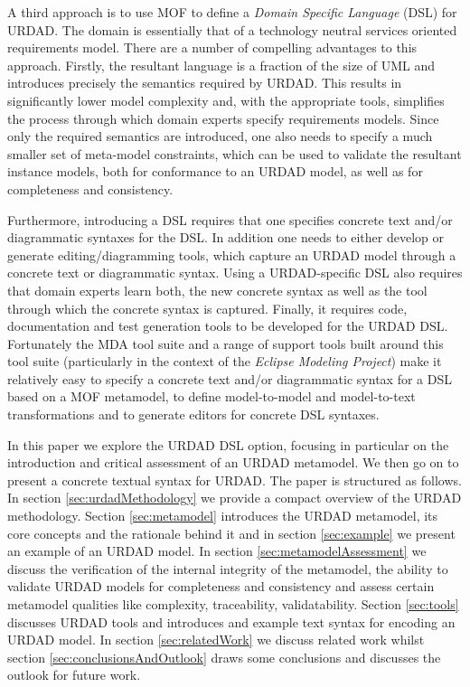 A third approach is to use MOF to define a {\em Domain Specific Language} (DSL) for URDAD. The domain is essentially that of a technology neutral services oriented requirements model. There are a number of compelling advantages to this approach. Firstly, the resultant language is a fraction of the size of UML and introduces precisely the semantics required by URDAD. This results in significantly lower model complexity and, with the appropriate tools, simplifies the process through which domain experts specify requirements models. Since only the required semantics are introduced, one also needs to specify a much smaller set of meta-model constraints, which can be used to validate the resultant instance models, both for conformance to an URDAD model, as well as for completeness and consistency.

Furthermore, introducing a DSL requires that one specifies concrete text and/or diagrammatic syntaxes for the DSL. In addition one needs to either develop or generate editing/diagramming tools, which capture an URDAD model through a concrete text or diagrammatic syntax. Using a URDAD-specific DSL also requires that domain experts learn both, the new concrete syntax as well as the tool through which the concrete syntax is captured. Finally, it requires code, documentation and test generation tools to be developed for the URDAD DSL. Fortunately the MDA tool suite and a range of support tools built around this tool suite (particularly in the context of the {\em Eclipse Modeling Project}) make it relatively easy to specify a concrete text and/or diagrammatic syntax for a DSL based on a MOF metamodel, to define model-to-model and model-to-text transformations and to generate editors for concrete DSL syntaxes.

In this paper we explore the URDAD DSL option, focusing in particular on the introduction and critical assessment of an URDAD metamodel. We then go on to present a concrete textual syntax for URDAD. The paper is structured as follows. In section \ref{sec:urdadMethodology} we provide a compact overview of the URDAD methodology. Section \ref{sec:metamodel} introduces the URDAD metamodel, its core concepts and the rationale behind it and in section \ref{sec:example} we present an example of an URDAD model. In section \ref{sec:metamodelAssessment} we discuss the verification of the internal integrity of the metamodel, the ability to validate URDAD models for completeness and consistency and assess certain metamodel qualities like complexity, traceability, validatability. Section \ref{sec:tools} discusses URDAD tools and introduces and example text syntax for encoding an URDAD model. In section \ref{sec:relatedWork} we discuss related work whilst section \ref{sec:conclusionsAndOutlook} draws some conclusions and discusses the outlook for future work.

